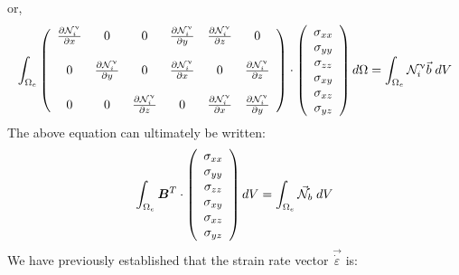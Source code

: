 or, 
\begin{equation}
\int_{\Omega_e} 
\left(
\begin{array}{cccccc}
\frac{\partial {\mathcal{N}}_i^\upnu}{\partial x} & 0 & 0& 
\frac{\partial {\mathcal{N}}_i^\upnu}{\partial y} & 
\frac{\partial {\mathcal{N}}_i^\upnu}{\partial z} & 0\\  \\
0 & \frac{\partial {\mathcal{N}}_i^\upnu}{\partial y} & 0  & 
\frac{\partial {\mathcal{N}}_i^\upnu}{\partial x}  & 0 &
\frac{\partial {\mathcal{N}}_i^\upnu}{\partial z}  \\ \\
0 & 0 & \frac{\partial {\mathcal{N}}_i^\upnu}{\partial z} &  0 & 
\frac{\partial {\mathcal{N}}_i^\upnu}{\partial x} &  
\frac{\partial {\mathcal{N}}_i^\upnu}{\partial y} 
\end{array}
\right)
\cdot
\left(
\begin{array}{c}
\sigma_{xx}\\
\sigma_{yy}\\
\sigma_{zz}\\
\sigma_{xy}\\
\sigma_{xz}\\
\sigma_{yz}\\
\end{array}
\right)
d\Omega = \int_{\Omega_e} {\mathcal{N}}_i^\upnu {\vec b} \; dV
\end{equation}
The above equation can ultimately be written:
\begin{equation}
\int_{\Omega_e} {\bm B}^T \cdot 
\left(
\begin{array}{c}
\sigma_{xx}\\
\sigma_{yy}\\
\sigma_{zz}\\
\sigma_{xy}\\
\sigma_{xz}\\
\sigma_{yz}
\end{array}
\right)
dV
=
\int_{\Omega_e} {\vec {{\mathcal{N}}}}_b\; dV
\end{equation}
We have previously established that the strain rate 
vector $\vec{\dot \varepsilon}$ is:
